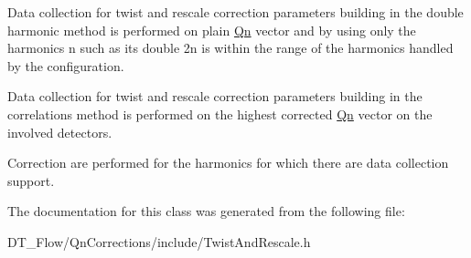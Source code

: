 Data collection for twist and rescale correction parameters building in the double harmonic method is performed on plain \mbox{\hyperlink{namespaceQn}{Qn}} vector and by using only the harmonics n such as its double 2n is within the range of the harmonics handled by the configuration.

Data collection for twist and rescale correction parameters building in the correlations method is performed on the highest corrected \mbox{\hyperlink{namespaceQn}{Qn}} vector on the involved detectors.

Correction are performed for the harmonics for which there are data collection support. 

The documentation for this class was generated from the following file\+:\begin{DoxyCompactItemize}
\item 
D\+T\+\_\+\+Flow/\+Qn\+Corrections/include/Twist\+And\+Rescale.\+h\end{DoxyCompactItemize}
